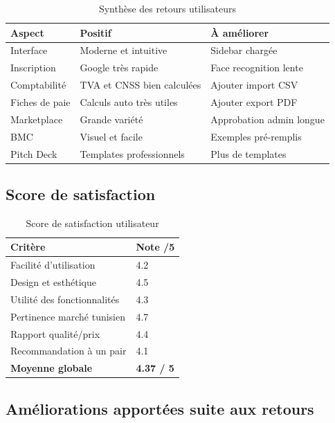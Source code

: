 \begin{table}[H]
\centering
\caption{Synthèse des retours utilisateurs}
\label{tab:user-feedback}
\begin{tabular}{|l|l|l|}
\hline
\textbf{Aspect} & \textbf{Positif} & \textbf{À améliorer} \\
\hline
Interface & Moderne et intuitive & Sidebar chargée \\
\hline
Inscription & Google très rapide & Face recognition lente \\
\hline
Comptabilité & TVA et CNSS bien calculées & Ajouter import CSV \\
\hline
Fiches de paie & Calculs auto très utiles & Ajouter export PDF \\
\hline
Marketplace & Grande variété & Approbation admin longue \\
\hline
BMC & Visuel et facile & Exemples pré-remplis \\
\hline
Pitch Deck & Templates professionnels & Plus de templates \\
\hline
\end{tabular}
\end{table}

\subsection{Score de satisfaction}

\begin{table}[H]
\centering
\caption{Score de satisfaction utilisateur}
\label{tab:satisfaction}
\begin{tabular}{|l|l|}
\hline
\textbf{Critère} & \textbf{Note /5} \\
\hline
Facilité d'utilisation & 4.2 \\
\hline
Design et esthétique & 4.5 \\
\hline
Utilité des fonctionnalités & 4.3 \\
\hline
Pertinence marché tunisien & 4.7 \\
\hline
Rapport qualité/prix & 4.4 \\
\hline
Recommandation à un pair & 4.1 \\
\hline
\textbf{Moyenne globale} & \textbf{4.37 / 5} \\
\hline
\end{tabular}
\end{table}

\subsection{Améliorations apportées suite aux retours}

